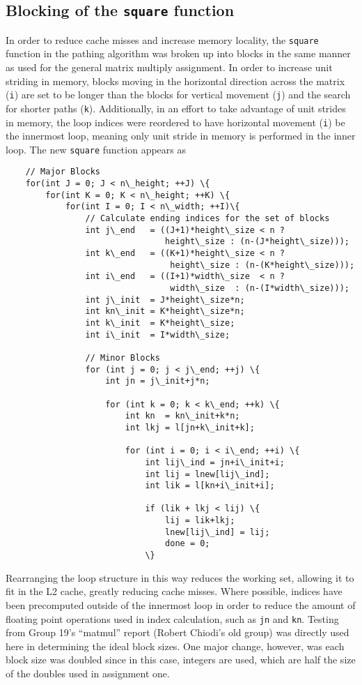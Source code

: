 \documentclass[11pt]{article}
\begin{document}
\subsection{Blocking of the \texttt{square} function}
\noindent In order to reduce cache misses and increase memory locality, the \texttt{square} function in the pathing algorithm was broken up into blocks in the same manner as used for the general matrix multiply assignment. In order to increase unit striding in memory, blocks moving in the horizontal direction across the matrix (\texttt{i}) are set to be longer than the blocks for vertical movement (\texttt{j}) and the search for shorter paths (\texttt{k}). Additionally, in an effort to take advantage of unit strides in memory, the loop indices were reordered to have horizontal movement (\texttt{i}) be the innermost loop, meaning only unit stride in memory is performed in the inner loop. The new \texttt{square} function appears as
\begin{lstlisting}
    // Major Blocks
    for(int J = 0; J < n\_height; ++J) \{
	    for(int K = 0; K < n\_height; ++K) \{
		    for(int I = 0; I < n\_width; ++I)\{
			    // Calculate ending indices for the set of blocks
			    int j\_end   = ((J+1)*height\_size < n ? 
							    height\_size : (n-(J*height\_size)));
			    int k\_end   = ((K+1)*height\_size < n ?
							     height\_size : (n-(K*height\_size)));
			    int i\_end   = ((I+1)*width\_size  < n ?
							     width\_size  : (n-(I*width\_size)));
			    int j\_init  = J*height\_size*n;
			    int kn\_init = K*height\_size*n;
			    int k\_init  = K*height\_size;
			    int i\_init  = I*width\_size;
    
			    // Minor Blocks
			    for (int j = 0; j < j\_end; ++j) \{
				    int jn = j\_init+j*n;
    
				    for (int k = 0; k < k\_end; ++k) \{
					    int kn  = kn\_init+k*n;
					    int lkj = l[jn+k\_init+k];
    
					    for (int i = 0; i < i\_end; ++i) \{
						    int lij\_ind = jn+i\_init+i;
						    int lij = lnew[lij\_ind];
						    int lik = l[kn+i\_init+i];
    
						    if (lik + lkj < lij) \{
							    lij = lik+lkj;
							    lnew[lij\_ind] = lij;
							    done = 0;
						    \}
\end{lstlisting}
\noindent Rearranging the loop structure in this way reduces the working set, allowing it to fit in the L2 cache, greatly reducing cache misses. Where possible, indices have been precomputed outside of the innermost loop in order to reduce the amount of floating point operations used in index calculation, such as \texttt{jn} and \texttt{kn}. Testing from Group 19's ``matmul'' report (Robert Chiodi's old group) was directly used here in determining the ideal block sizes. One major change, however, was each block size was doubled since in this case, integers are used, which are half the size of the doubles used in assignment one. \\
\end{document}
